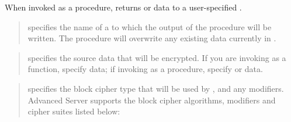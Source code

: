 \documentclass[letterpaper,10pt,english,openany,oneside]{sphinxmanual}
\begin{document}
When invoked as a procedure,  returns  or  data to a
user-specified .


\begin{quote}

 specifies the name of a  to which the output of the
 procedure will be written. The  procedure will
overwrite any existing data currently in .
\end{quote}

\begin{quote}

 specifies the source data that will be encrypted. If you are
invoking  as a function, specify  data; if invoking
 as a procedure, specify  or  data.
\end{quote}

\begin{quote}

 specifies the block cipher type that will be used by ,
and any modifiers. Advanced Server supports the block cipher
algorithms, modifiers and cipher suites listed below:
\end{quote}
\end{document}
